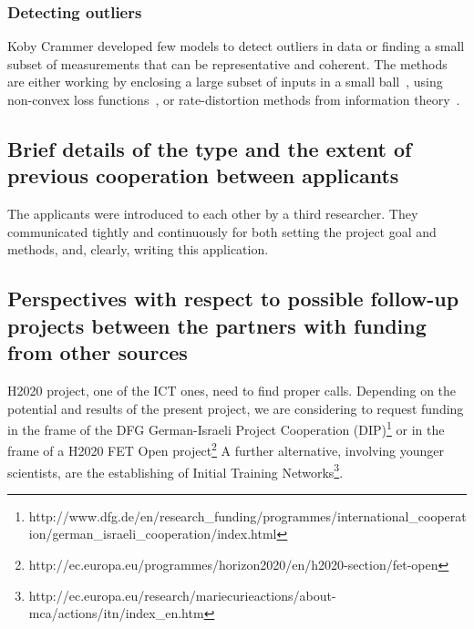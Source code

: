 \documentclass[12pt]{article}
\begin{document}
\subsubsection*{Detecting outliers}
Koby Crammer developed few models to detect outliers in data or finding a small subset of measurements that can be representative and coherent. The methods are either working by enclosing a large subset of inputs in a small ball~\cite{DBLP:conf/colt/CrammerS03}, using non-convex loss functions~\cite{CrammerCh04}, or rate-distortion methods from information theory~\cite{DBLP:conf/icml/CrammerTP08}.



\subsection*{Brief details of the type and the extent of previous cooperation between applicants}
The applicants were introduced to each other by a third researcher. They communicated tightly and continuously for both setting the project goal and methods, and, clearly, writing this application. 

\subsection*{Perspectives with respect to possible follow-up projects between the partners with funding from other sources}
H2020 project, one of the ICT ones, need to find proper calls.
Depending on the potential and results of the present project, we are considering to request funding in the frame of the DFG German-Israeli Project Cooperation (DIP)\footnote{http://www.dfg.de/en/research\_funding/programmes/international\_cooperation/german\_israeli\_cooperation/index.html} or in the frame of a H2020 FET Open project\footnote{http://ec.europa.eu/programmes/horizon2020/en/h2020-section/fet-open}
A further alternative, involving younger scientists, are the establishing of Initial Training Networks\footnote{http://ec.europa.eu/research/mariecurieactions/about-mca/actions/itn/index\_en.htm}.
\end{document}
